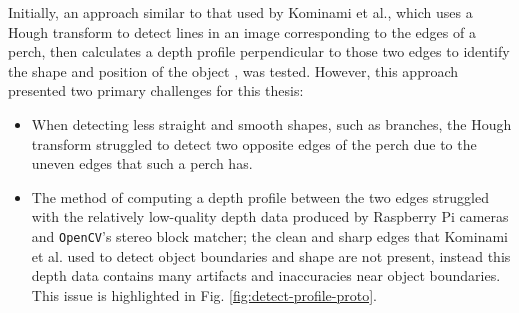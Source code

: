 Initially, an approach similar to that used by Kominami et al., which uses a Hough transform to detect lines in an 
image corresponding to the edges of a perch, then calculates a depth profile perpendicular to those two edges to identify 
the shape and position of the object \cite{kominami_detection_2023}, was tested. However, this approach presented two primary challenges
for this thesis:
\begin{itemize}
    \item When detecting less straight and smooth shapes, such as branches, the Hough transform struggled to detect 
        two opposite edges of the perch due to the uneven edges that such a perch has. 
    \item The method of computing a depth profile between the two edges struggled with the relatively low-quality 
        depth data produced by Raspberry Pi cameras and \texttt{OpenCV}'s stereo block matcher; the clean and sharp
        edges that Kominami et al. used to detect object boundaries and shape are not present, instead this depth data
        contains many artifacts and inaccuracies near object boundaries. This issue is highlighted in Fig. \ref{fig:detect-profile-proto}.
\end{itemize}


